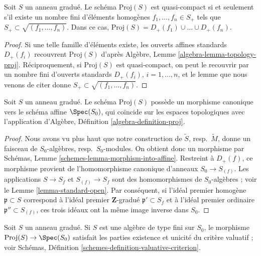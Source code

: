 \begin{lemma}
\label{lemma-proj-quasi-compact}
Soit $S$ un anneau gradué. Le schéma
$\text{Proj}(S)$ est quasi-compact si et
seulement s'il existe un nombre fini d'éléments homogènes
$f_1, \ldots, f_n \in S_{+}$ tels que
$S_{+} \subset \sqrt{(f_1, \ldots, f_n)}$. Dans ce cas,
$\text{Proj}(S) = D_+(f_1) \cup \ldots \cup D_+(f_n)$.
\end{lemma}

\begin{proof}
Si une telle famille d'éléments existe, les ouverts affines standards
$D_{+}(f_i)$ recouvrent $\text{Proj}(S)$ d'après Algèbre,
Lemme \ref{algebra-lemma-topology-proj}. Réciproquement, si
$\text{Proj}(S)$ est quasi-compact, on
peut le recouvrir par un nombre fini
d'ouverts standards $D_{+}(f_i)$, $i = 1, \ldots, n$, et le lemme que nous
venons de citer donne
$S_{+} \subset \sqrt{(f_1, \ldots, f_n)}$.
\end{proof}

\begin{lemma}
\label{lemma-structure-morphism-proj}
Soit $S$ un anneau gradué. Le schéma $\text{Proj}(S)$ possède un morphisme
canonique vers le schéma affine $\Spec(S_0)$, qui coïncide sur les espaces
topologiques avec l'application d'Algèbre,
Définition \ref{algebra-definition-proj}.
\end{lemma}

\begin{proof}
Nous avons vu plus haut que notre construction de $\widetilde S$, resp.\ $\widetilde M$,
donne un faisceau de $S_0$-algèbres, resp.\ $S_0$-modules.
On obtient donc un morphisme par Schémas,
Lemme \ref{schemes-lemma-morphism-into-affine}. Restreint à $D_{+}(f)$, ce
morphisme provient de l'homomorphisme canonique d'anneaux
$S_0 \to S_{(f)}$. Les applications $S \to S_f$ et $S_{(f)} \to S_f$ sont
des homomorphismes de $S_0$-algèbres ; voir le
Lemme \ref{lemma-standard-open}. Par conséquent, si l'idéal premier homogène
$\mathfrak p \subset S$ correspond à l'idéal premier $\mathbf{Z}$-gradué
$\mathfrak p' \subset S_f$ et à l'idéal premier ordinaire
$\mathfrak p'' \subset S_{(f)}$, ces trois idéaux ont la même image inverse
dans $S_0$.
\end{proof}

\begin{lemma}
\label{lemma-proj-valuative-criterion}
Soit $S$ un anneau gradué. Si $S$ est une algèbre de type fini sur $S_0$,
le morphisme $\text{Proj}(S) \to \Spec(S_0)$
satisfait les parties existence
et unicité du critère valuatif ; voir Schémas,
Définition \ref{schemes-definition-valuative-criterion}.
\end{lemma}

